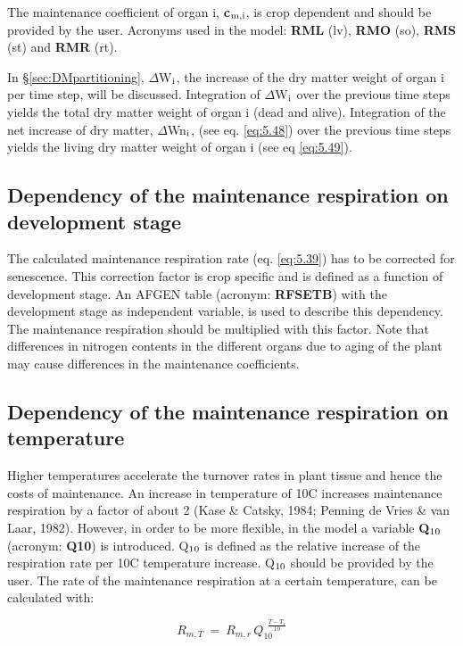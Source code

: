 The maintenance coefficient of organ i, {\bf c$_{{\rm m,i}}$}, is crop dependent and should be provided by
the user. Acronyms used in the model: {\bf RML} (lv), {\bf RMO} (so), {\bf RMS} (st) and {\bf RMR} (rt).

In \S \ref{sec:DMpartitioning}, $\Delta$W$_{{\rm i}}$, the increase of the dry matter weight of 
organ i per time step, will be
discussed. Integration of $\Delta$W$_{{\rm i}}$ over the previous time steps yields the total dry matter
weight of organ i (dead and alive). Integration of the net increase of dry matter, $\Delta$Wn$_{{\rm i}}$,
(see eq. \ref{eq:5.48}) over the previous time steps yields the living dry matter weight of organ i
(see eq \ref{eq:5.49}).

\subsection{Dependency of the maintenance respiration on development stage}
The calculated maintenance respiration rate (eq. \ref{eq:5.39}) has to be corrected for senescence.
This correction factor is crop specific and is defined as a function of development stage. 
An AFGEN table (acronym: {\bf RFSETB}) with the development stage as
independent variable, is used to describe this dependency. The maintenance respiration
should be multiplied with this factor.  Note that differences in nitrogen contents in the different organs 
due to aging of the plant may cause differences in the maintenance coefficients. 

\subsection{Dependency of the maintenance respiration on temperature}
Higher temperatures accelerate the turnover rates in plant tissue and hence the costs of
maintenance. An increase in temperature of 10\degrees C increases maintenance respiration by a
factor of about 2 (Kase \& Catsky, 1984; Penning de Vries \& van Laar, 1982). However,
in order to be more flexible, in the model a variable {\bf Q$_{{\rm 10}}$} (acronym: {\bf Q10}) is introduced.
Q$_{{\rm 10}}$ is defined as the relative increase of the respiration rate per 10\degrees C temperature
increase. Q$_{{\rm 10}}$ should be provided by the user. The rate of the maintenance respiration at a
certain temperature, can be calculated with:

\begin{equation}
\label{eq:5.40}
R _{m,T} ~=~ R _{m,r} \, Q _{10}^{~~{\frac{T-T _{r} }{10}} }
\end{equation}

